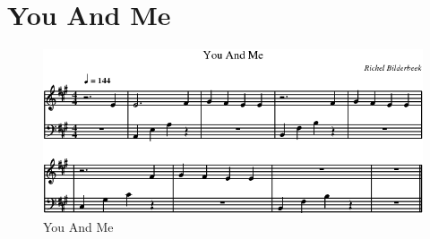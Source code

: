 \section{You And Me}



\begin{figure}[!htbp]
  \includegraphics[width=\textwidth,height=\textheight,keepaspectratio]{../songs/41_you_and_me.png}
  \caption{You And Me}
  \label{fig:41_you_and_me}
\end{figure}
